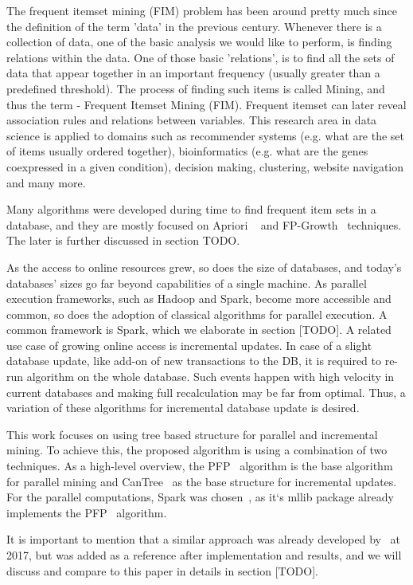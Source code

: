 The frequent itemset mining (FIM) problem has been around pretty much since the definition of the term 'data' in the previous century. Whenever there is a collection of data, one of the basic analysis we would like to perform, is finding relations within the data. One of those basic 'relations', is to find all the sets of data that appear together in an important frequency (usually greater than a predefined threshold).  The process of finding such items is called Mining, and thus the term - Frequent Itemset Mining (FIM). Frequent itemset can later reveal association rules and relations between variables. This research area in data science is applied to domains such as recommender systems (e.g. what are the set of items usually ordered together), bioinformatics (e.g. what are the genes coexpressed in a given condition), decision making, clustering, website navigation and many more.

Many algorithms were developed during time to find frequent item sets in a database, and they are mostly focused on Apriori ~\cite{agrawal1994fast} and FP-Growth~\cite{kohefficient} techniques.  The later is further discussed in section TODO.

As the access to online resources grew, so does the size of databases, and today’s databases’ sizes go far beyond capabilities of a single machine. As parallel execution frameworks, such as Hadoop and Spark, become more accessible and common, so does the adoption of classical algorithms for parallel execution. A common framework is Spark, which we elaborate in section [TODO]. A related use case of growing online access is incremental updates. In case of a slight database update, like add-on of new transactions to the DB, it is required to re-run algorithm on the whole database. Such events happen with high velocity in current databases and making full recalculation may be far from optimal.
Thus, a variation of these algorithms for incremental database update is desired.

This work focuses on using tree based structure for parallel and incremental mining. To achieve this, the proposed algorithm is using a combination of two techniques. As a high-level overview, the PFP~\cite{li2008pfp} algorithm is the base algorithm for parallel mining and CanTree~\cite{leung2005cantree} as the base structure for incremental updates.  For the parallel computations, Spark was chosen~\cite{spark}, as it`s mllib package already implements the PFP~\cite{li2008pfp} algorithm.

It is important to mention that a similar approach was already developed by~\cite{song2017} at 2017, but was added as a reference after implementation and results, and we will discuss and compare to this paper in details in section [TODO]. 

